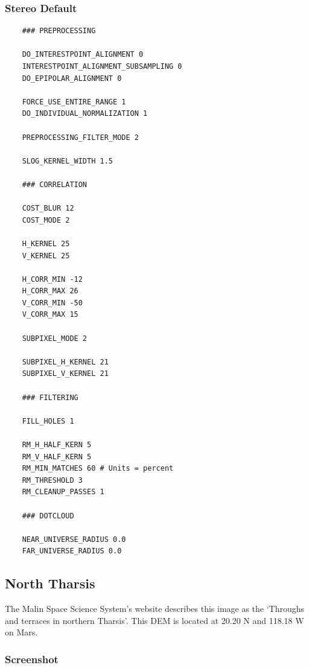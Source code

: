 \subsubsection*{Stereo Default}

\begin{verbatim}
    ### PREPROCESSING

    DO_INTERESTPOINT_ALIGNMENT 0
    INTERESTPOINT_ALIGNMENT_SUBSAMPLING 0
    DO_EPIPOLAR_ALIGNMENT 0

    FORCE_USE_ENTIRE_RANGE 1
    DO_INDIVIDUAL_NORMALIZATION 1

    PREPROCESSING_FILTER_MODE 2

    SLOG_KERNEL_WIDTH 1.5

    ### CORRELATION

    COST_BLUR 12
    COST_MODE 2

    H_KERNEL 25
    V_KERNEL 25

    H_CORR_MIN -12
    H_CORR_MAX 26
    V_CORR_MIN -50
    V_CORR_MAX 15

    SUBPIXEL_MODE 2

    SUBPIXEL_H_KERNEL 21
    SUBPIXEL_V_KERNEL 21

    ### FILTERING

    FILL_HOLES 1

    RM_H_HALF_KERN 5
    RM_V_HALF_KERN 5
    RM_MIN_MATCHES 60 # Units = percent
    RM_THRESHOLD 3
    RM_CLEANUP_PASSES 1

    ### DOTCLOUD

    NEAR_UNIVERSE_RADIUS 0.0
    FAR_UNIVERSE_RADIUS 0.0
\end{verbatim}

\subsection{North Tharsis}

The Malin Space Science System's website describes this image as the
`Throughs and terraces in northern Tharsis'. This DEM is located at
20.20 N and 118.18 W on Mars.

\subsubsection*{Screenshot}

